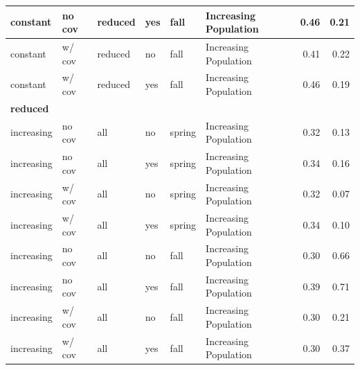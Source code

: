 \documentclass[
  12pt,
]{article}
\begin{document}
\begin{table}
\begin{tabular}{l|l|l|l|l|l|r|r}
\hline
\hspace{1em}\hspace{1em}constant & no cov & reduced & yes & fall & Increasing Population & 0.46 & 0.21\\
\hline
\hspace{1em}\hspace{1em}constant & w/ cov & reduced & no & fall & Increasing Population & 0.41 & 0.22\\
\hline
\hspace{1em}\hspace{1em}constant & w/ cov & reduced & yes & fall & Increasing Population & 0.46 & 0.19\\
\hline
\multicolumn{1}{l}{\textbf{reduced}}\\
\hline
\hspace{1em}\hspace{1em}increasing & no cov & all & no & spring & Increasing Population & 0.32 & 0.13\\
\hline
\hspace{1em}\hspace{1em}increasing & no cov & all & yes & spring & Increasing Population & 0.34 & 0.16\\
\hline
\hspace{1em}\hspace{1em}increasing & w/ cov & all & no & spring & Increasing Population & 0.32 & 0.07\\
\hline
\hspace{1em}\hspace{1em}increasing & w/ cov & all & yes & spring & Increasing Population & 0.34 & 0.10\\
\hline
\hspace{1em}\hspace{1em}increasing & no cov & all & no & fall & Increasing Population & 0.30 & 0.66\\
\hline
\hspace{1em}\hspace{1em}increasing & no cov & all & yes & fall & Increasing Population & 0.39 & 0.71\\
\hline
\hspace{1em}\hspace{1em}increasing & w/ cov & all & no & fall & Increasing Population & 0.30 & 0.21\\
\hline
\hspace{1em}\hspace{1em}increasing & w/ cov & all & yes & fall & Increasing Population & 0.30 & 0.37\\

\end{tabular}
\end{table}
\end{document}

